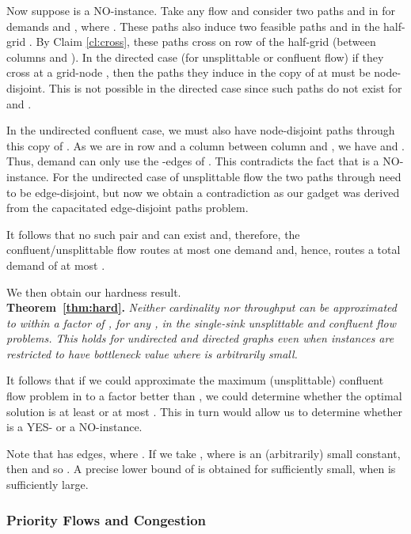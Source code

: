 \documentclass[12pt]{article}
\newcommand{\qed}{}
\begin{document}
Now suppose  is a NO-instance.
Take any flow and consider two paths  and  in  for demands  and , where .
These paths also induce two feasible paths  and  in the half-grid .
By Claim \ref{cl:cross}, these paths cross on row  of the half-grid (between columns  and ).
In the directed case (for unsplittable or confluent flow) if they cross at a grid-node , then the paths they induce in the copy of  at 
must be node-disjoint. This is not possible in the directed case since
such paths do not exist for  and .

In the undirected confluent case, we must also have node-disjoint paths through this copy of .
 As we are in row  and a column between column  and ,
we have  and . Thus, demand  can only use the -edges of .
This contradicts the fact that  is a NO-instance. For the undirected case of unsplittable flow the two
paths through  need to be edge-disjoint, but now we obtain a contradiction as
our gadget was derived from the
capacitated edge-disjoint paths problem.

It follows that no such pair  and  can exist and, therefore, the confluent/unsplittable flow routes at
most one demand and, hence, routes a total demand of at most .
\qed

We then obtain our hardness result. \\

{{\noindent\bf Theorem~\ref{thm:hard}.} \itshape
Neither cardinality nor throughput can be approximated to
within a factor of , for any
, in the single-sink unsplittable and confluent flow problems.
This holds for  undirected and directed graphs even
when instances are restricted to have bottleneck value
 where  is arbitrarily small.\\
}

 It follows that if we could
approximate the maximum (unsplittable) confluent flow problem in  to a
factor better than , we could determine whether the optimal solution is
at least  or at most . This in turn would allow us to determine whether  is a YES-
or a NO-instance.

Note that  has  edges, where . If we
take , where  is an (arbitrarily)
small constant, then  and so
.   A precise lower bound of  is obtained for
 sufficiently small, when  is sufficiently large.
\qed



\subsubsection{Priority Flows and Congestion}
\label{sec:congestion}
\end{document}
